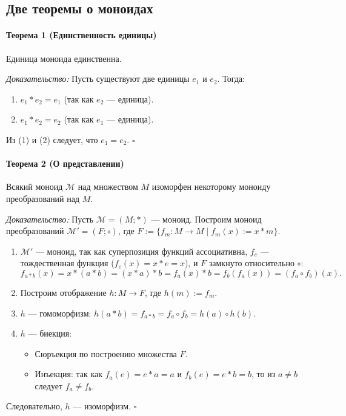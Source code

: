\subsection*{Две теоремы о моноидах}

\paragraph{Теорема 1 (Единственность единицы)}
Единица моноида единственна.

\textit{Доказательство:}
Пусть существуют две единицы $e_1$ и $e_2$. Тогда:
\begin{enumerate}
    \item $e_1 \ast e_2 = e_1$ (так как $e_2$ — единица).
    \item $e_1 \ast e_2 = e_2$ (так как $e_1$ — единица).
\end{enumerate}
Из (1) и (2) следует, что $e_1 = e_2$. $\square$

\paragraph{Теорема 2 (О представлении)}
Всякий моноид $\mathcal{M}$ над множеством $M$ изоморфен некоторому моноиду преобразований над $M$.

\textit{Доказательство:}
Пусть $\mathcal{M} = (M; \ast)$ — моноид. Построим моноид преобразований $\mathcal{M}' = (F; \circ)$, где $F := \{f_m: M \to M \mid f_m(x) := x \ast m\}$.
\begin{enumerate}
    \item $\mathcal{M}'$ — моноид, так как суперпозиция функций ассоциативна, $f_e$ — тождественная функция ($f_e(x) = x \ast e = x$), и $F$ замкнуто относительно $\circ$:
    $$f_{a \ast b}(x) = x \ast (a \ast b) = (x \ast a) \ast b = f_a(x) \ast b = f_b(f_a(x)) = (f_a \circ f_b)(x).$$
    \item Построим отображение $h: M \to F$, где $h(m) := f_m$.
    \item $h$ — гомоморфизм: $h(a \ast b) = f_{a \ast b} = f_a \circ f_b = h(a) \circ h(b)$.
    \item $h$ — биекция:
    \begin{itemize}
        \item Сюръекция по построению множества $F$.
        \item Инъекция: так как $f_a(e) = e \ast a = a$ и $f_b(e) = e \ast b = b$, то из $a \neq b$ следует $f_a \neq f_b$.
    \end{itemize}
\end{enumerate}
Следовательно, $h$ — изоморфизм. $\square$

